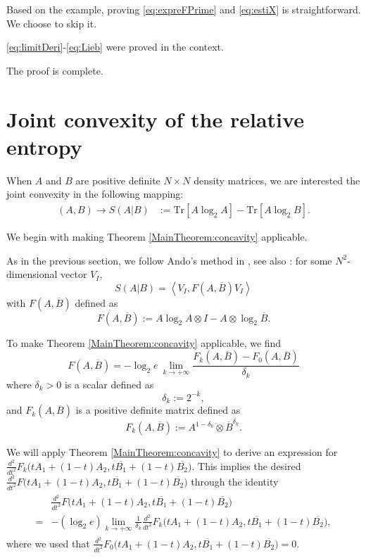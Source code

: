 \documentclass{article}
\numberwithin{equation}{section}
\begin{document}
Based on the example, proving \eqref{eq:expreFPrime} and \eqref{eq:estiX} is straightforward. We choose to skip it.

\eqref{eq:limitDeri}-\eqref{eq:Lieb} were proved in the context.

The proof is complete.



\section{Joint convexity of the relative entropy}\label{sec:relative}
When $A$ and $B$ are positive definite $N\times N$ density matrices, we are interested the joint convexity in the following mapping:
\begin{align}\label{def:relative}
    (A,B)\rightarrow S(A|B) &:= \text{Tr}[A \log_2 A] - \text{Tr}[A \log_2 B].
\end{align} 

We begin with making Theorem \ref{MainTheorem:concavity} applicable.

As in the previous section, we follow Ando's method in \cite{ANDO1979203}, see also \cite{carlen2010trace}: for some $ N^2$-dimensional vector $V_{I}$,
\begin{equation}\label{def:conditional}
S(A|B) = \left\langle V_I, F(A,\overline{B}) V_I \right\rangle
\end{equation}
with $F(A,\overline{B})$ defined as $$F(A, \overline{B}) := A \log_2 A \otimes I - A \otimes \log_2 \overline{B}.$$

To make Theorem \ref{MainTheorem:concavity} applicable, we find 
\begin{equation}\label{limit:FnAB}
    F(A,\overline{B})=-\log_2 e\ \lim_{k\rightarrow +\infty} \frac{F_{k}(A,\overline{B})-F_{0}(A,\overline{B})}{\delta_{k}}
\end{equation}
where $\delta_{k}>0$ is a scalar defined as $$\delta_{k}:=2^{-k},$$ and $F_k(A,\overline{B})$ is a positive definite matrix defined as
$$F_{k}(A,\overline{B}):=A^{1-\delta_k} \otimes \overline{B}^{\delta_k}.$$





We will apply Theorem \ref{MainTheorem:concavity} to derive an expression for $\frac{d^2}{dt^2}F_k\big(tA_1+(1-t)A_2,t\overline{B_1}+(1-t)\overline{B_2}\big)$. This implies the desired $\frac{d^2}{dt^2}F\big(tA_1+(1-t)A_2,t\overline{B_1}+(1-t)\overline{B_2}\big)$ through the identity
\begin{align}\label{eq:FtA}
\begin{split}
    &\frac{d^2}{dt^2} F\big(tA_1+(1-t)A_2,t\overline{B_1}+(1-t)\overline{B_2}\big)\\
    =&-(\log_2 e)\lim_{k\rightarrow +\infty} \frac{1}{\delta_k}\frac{d^2}{dt^2} F_{k}\big(tA_1+(1-t)A_2,t\overline{B_1}+(1-t)\overline{B_2}\big), 
\end{split}
\end{align} where we used that $\frac{d^2}{dt^2}F_{0}\big(tA_1+(1-t)A_2,t\overline{B_1}+(1-t)\overline{B_2}\big)=0.$
\end{document}
